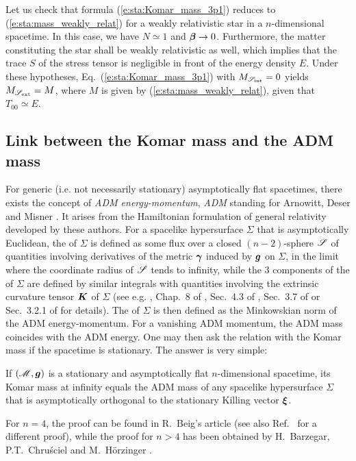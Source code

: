 \begin{example}
\label{x:sta:Komar_mass_star_dim_n}
Let us check that formula (\ref{e:sta:Komar_mass_3p1}) reduces
to (\ref{e:sta:mass_weakly_relat}) for a weakly relativistic
star in a $n$-dimensional spacetime.
In this case, we have $N\simeq 1$ and
$\bm{\beta} \to 0$. Furthermore,
the matter constituting the star shall
be weakly relativistic as well, which implies that the trace $S$ of the stress
tensor is negligible in front of the energy density $E$. Under these
hypotheses, Eq.~(\ref{e:sta:Komar_mass_3p1}) with $M_{\mathscr{S}_{\rm int}} =0$
yields $M_{\mathscr{S}_{\rm ext}} = M$, where
$M$ is given by (\ref{e:sta:mass_weakly_relat}),
given that $T_{00} \simeq E$.
\end{example}

\subsection{Link between the Komar mass and the ADM mass}  \label{s:sta:Komar_ADM}

For generic (i.e. not necessarily stationary) asymptotically flat spacetimes,
there exists the concept of \emph{ADM energy-momentum}, \emph{ADM} standing for
Arnowitt, Deser and Misner \cite{ArnowDM62}. It arises from the Hamiltonian
formulation of general relativity developed by these authors.
For a spacelike hypersurface $\Sigma$ that is asymptotically Euclidean,
the  of $\Sigma$ is defined
as some flux over a closed $(n-2)$-sphere $\mathscr{S}$ of quantities involving derivatives
of the metric $\bm{\gamma}$ induced by $\bm{g}$ on $\Sigma$, in the limit where
the coordinate radius of $\mathscr{S}$ tends to infinity, while the
3 components of the 
of $\Sigma$ are defined by similar integrals with quantities involving the extrinsic curvature
tensor $\bm{K}$ of $\Sigma$ (see e.g. \cite{JaramG11},
Chap.~8 of \cite{Gourg12}, Sec.~4.3 of \cite{Poiss04},
Sec.~3.7 of \cite{Strau13} or Sec.~3.2.1 of \cite{Szaba09} for details).
The  of $\Sigma$
is then defined as the Minkowskian norm of the ADM energy-momentum.
For a vanishing ADM momentum, the ADM mass coincides with the ADM energy.
One may then ask the relation with the Komar mass if the spacetime is stationary.
The answer is very simple:
\begin{prop}
\label{p:sta:Komar_ADM_mass}
If $(\mathscr{M},\bm{g})$ is a stationary and asymptotically flat $n$-dimensional spacetime,
its Komar mass at infinity equals the ADM mass of any spacelike hypersurface
$\Sigma$ that is asymptotically orthogonal to the stationary Killing vector $\bm{\xi}$.
\end{prop}
For $n=4$, the proof can be found in R.~Beig's article \cite{Beig78}
(see also Ref.~\cite{AshteM79} for a different proof), while the proof
for $n>4$ has been obtained by H.~Barzegar, P.T.~Chruściel and M.~Hörzinger \cite{BarzgCH17}.


